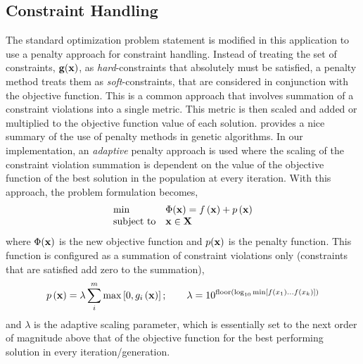 \subsection{Constraint Handling}
The standard optimization problem statement is modified in this
application to use a penalty approach for constraint handling.  Instead
of treating the set of constraints, $\mathbf{g}(\mathbf{x})$, as
\textit{hard}-constraints that absolutely must be satisfied, a penalty
method treats them as \textit{soft}-constraints, that are considered in
conjunction with the objective function.  This is a common approach that
involves summation of a constraint violations into a single metric.
This metric is then scaled and added or multiplied to the objective
function value of each solution.  \citet{yeniay05} provides a nice
summary of the use of penalty methods in genetic algorithms.  In our
implementation, an \textit{adaptive} penalty approach is used where the
scaling of the constraint violation summation is dependent on the value
of the objective function of the best solution in the population at
every iteration.  With this approach, the problem formulation becomes,
\begin{equation}
\begin{array}{ll}
  \min & \Phi(\mathbf{x}) = f\left(\mathbf{x}\right) + p\left(\mathbf{x}\right)\\
  \text{subject to}& \mathbf{x} \in \mathbf{X}\\
  \end{array}
\end{equation}
where $\Phi(\mathbf{x})$ is the new objective function and $p(\mathbf{x})$ is
the penalty function.  This function is configured as a summation of
constraint violations only (constraints that are satisfied add zero to the summation),
\begin{equation} \label{eqn:penalty}
p\left(\mathbf{x}\right) = \lambda \sum_i^m \max\left[0,g_i
  \left(\mathbf{x}\right)\right];
\qquad \lambda = 10^{\text{floor} \left( \log_{10} \min\left[f\left(x_1\right)
  \ldots f\left(x_k\right) \right] \right)}
\end{equation}
and $\lambda$ is the adaptive scaling parameter, which is essentially
set to the next order of magnitude above that of the objective function
for the best performing solution in every iteration/generation.

